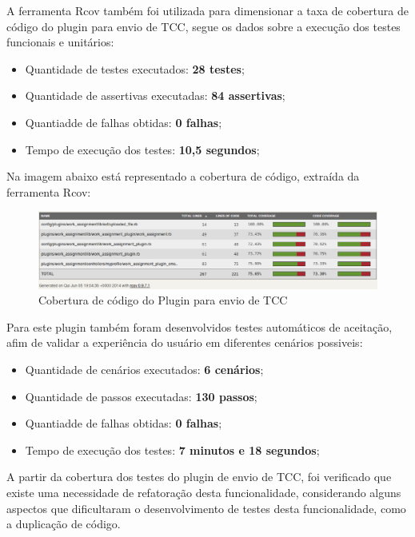A ferramenta Rcov também foi utilizada para dimensionar a taxa de cobertura de código do plugin para envio de TCC, segue os dados sobre a execução dos testes funcionais e unitários:
\begin{itemize}
\item Quantidade de testes executados: \textbf{28 testes};
\item Quantidade de assertivas executadas: \textbf{84 assertivas};
\item Quantiadde de falhas obtidas: \textbf{0 falhas};
\item Tempo de execução dos testes: \textbf{10,5 segundos};
\end{itemize}

Na imagem abaixo está representado a cobertura de código, extraída da ferramenta Rcov:

\begin{figure}[!h]
    \centering
    \includegraphics[keepaspectratio=false,scale=0.45]
      {figuras/cobertura_tcc.eps}
    \caption{Cobertura de código do Plugin para envio de TCC}
    \label{consideracoes_cobertura2}
\end{figure}

Para este plugin também foram desenvolvidos testes automáticos de aceitação, afim de validar a experiência do usuário em diferentes cenários possiveis:
\begin{itemize}
\item Quantidade de cenários executados: \textbf{6 cenários};
\item Quantidade de passos executadas: \textbf{130 passos};
\item Quantiadde de falhas obtidas: \textbf{0 falhas};
\item Tempo de execução dos testes: \textbf{7 minutos e 18 segundos};
\end{itemize}

A partir da cobertura dos testes do plugin de envio de TCC, foi verificado que existe uma necessidade de refatoração desta funcionalidade, considerando alguns aspectos que dificultaram o desenvolvimento de testes desta funcionalidade, como a duplicação de código.

